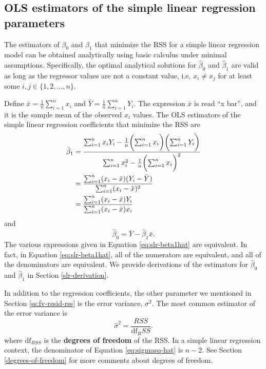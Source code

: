 \documentclass[
]{book}
\theoremstyle{definition}
\theoremstyle{definition}
\theoremstyle{definition}
\theoremstyle{definition}
\theoremstyle{remark}
\begin{document}
\hypertarget{ols-estimators-of-the-simple-linear-regression-parameters}{%
\subsection{OLS estimators of the simple linear regression parameters}\label{ols-estimators-of-the-simple-linear-regression-parameters}}

The estimators of \(\beta_0\) and \(\beta_1\) that minimize the RSS for a simple linear regression model can be obtained analytically using basic calculus under minimal assumptions. Specifically, the optimal analytical solutions for \(\hat{\beta}_0\) and \(\hat{\beta}_1\) are valid as long as the regressor values are not a constant value, i.e, \(x_i \neq x_j\) for at least some \(i,j\in \{1,2,\ldots,n\}\).

Define \(\bar{x}=\frac{1}{n}\sum_{i=1}^n x_i\) and
\(\bar{Y} = \frac{1}{n}\sum_{i=1}^n Y_i\). The expression \(\bar{x}\) is read ``x bar'', and it is the sample mean of the observed \(x_i\) values. The OLS estimators of the simple linear regression coefficients that minimize the RSS are
\[
\begin{aligned}
\hat{\beta}_1 &= \frac{\sum_{i=1}^n x_i Y_i - \frac{1}{n} \biggl(\sum_{i=1}^n x_i\biggr)\biggl(\sum_{i=1}^n Y_i\biggr)}{\sum_{i=1}^n x_i^2 - \frac{1}{n} \biggl(\sum_{i=1}^n x_i\biggr)^2} \notag \\
&= \frac{\sum_{i=1}^n (x_i - \bar{x})(Y_i - \bar{Y})}{\sum_{i=1}^n (x_i - \bar{x})^2} \notag \\
&= \frac{\sum_{i=1}^n (x_i - \bar{x})Y_i}{\sum_{i=1}^n (x_i - \bar{x})x_i}
\end{aligned}
\label{eq:slr-beta1hat}
\]
and
\[
\hat{\beta}_0 = \bar{Y} - \hat{\beta}_1 \bar{x}. \label{eq:slr-beta0hat}
\]
The various expressions given in Equation \eqref{eq:slr-beta1hat} are equivalent. In fact, in Equation \eqref{eq:slr-beta1hat}, all of the numerators are equivalent, and all of the denominators are equivalent. We provide derivations of the estimators for \(\hat{\beta}_0\) and \(\hat{\beta}_1\) in Section \ref{slr-derivation}.

In addition to the regression coefficients, the other parameter we mentioned in Section \ref{ss:fv-resid-rss} is the error variance, \(\sigma^2\). The most common estimator of the error variance is
\[
\hat{\sigma}^2 = \frac{RSS}{\mathrm{df}_RSS}. \label{eq:sigmasq-hat}
\]
where \(\mathrm{df}_{RSS}\) is the \textbf{degrees of freedom} of the RSS. In a simple linear regression context, the denominator of Equation \eqref{eq:sigmasq-hat} is \(n-2\). See Section \ref{degrees-of-freedom} for more comments about degrees of freedom.
\end{document}
